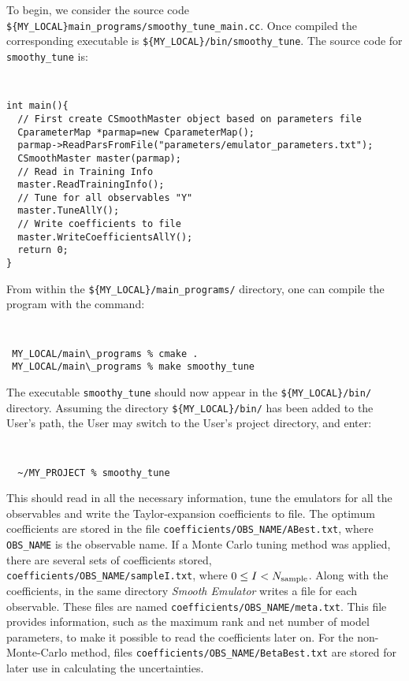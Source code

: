 \documentclass[UserManual.tex]{subfiles}
\begin{document}
To begin, we consider the source code {\tt \$\{MY\_LOCAL\}main\_programs/smoothy\_tune\_main.cc}. Once compiled the corresponding executable is {\tt \$\{MY\_LOCAL\}/bin/smoothy\_tune}. The source code for {\tt smoothy\_tune} is:
{\tt
\begin{verbatim}
int main(){
  // First create CSmoothMaster object based on parameters file
  CparameterMap *parmap=new CparameterMap();
  parmap->ReadParsFromFile("parameters/emulator_parameters.txt");
  CSmoothMaster master(parmap); 
  // Read in Training Info
  master.ReadTrainingInfo(); 
  // Tune for all observables "Y"
  master.TuneAllY();
  // Write coefficients to file
  master.WriteCoefficientsAllY();
  return 0;
}
\end{verbatim}
}
From within the {\tt \$\{MY\_LOCAL\}/main\_programs/} directory, one can compile the program with the command:
{\tt
\begin{verbatim}
 MY_LOCAL/main\_programs % cmake .
 MY_LOCAL/main\_programs % make smoothy_tune
\end{verbatim}
}
The executable {\tt smoothy\_tune} should now appear in the {\tt \$\{MY\_LOCAL\}/bin/} directory. Assuming the directory {\tt \$\{MY\_LOCAL\}/bin/} has been added to the User's path, the User may switch to the User's project directory, and enter:
{\tt
\begin{verbatim}
  ~/MY_PROJECT % smoothy_tune
\end{verbatim}
}
This should read in all the necessary information, tune the emulators for all the observables and write the Taylor-expansion coefficients to file.  The optimum coefficients are stored in the file {\tt coefficients/OBS\_NAME/ABest.txt}, where {\tt OBS\_NAME} is the observable name. If a Monte Carlo tuning method was applied, there are several sets of coefficients stored,  {\tt coefficients/OBS\_NAME/sampleI.txt}, where $0\le I<N_{\rm sample}$. Along with the coefficients, in the same directory {\it Smooth Emulator} writes a file for each observable. These files are named {\tt coefficients/OBS\_NAME/meta.txt}.  This file provides information, such as the maximum rank and net number of model parameters, to make it possible to read the coefficients later on. For the non-Monte-Carlo method,  files {\tt coefficients/OBS\_NAME/BetaBest.txt} are stored for later use in calculating the uncertainties.
\end{document}
